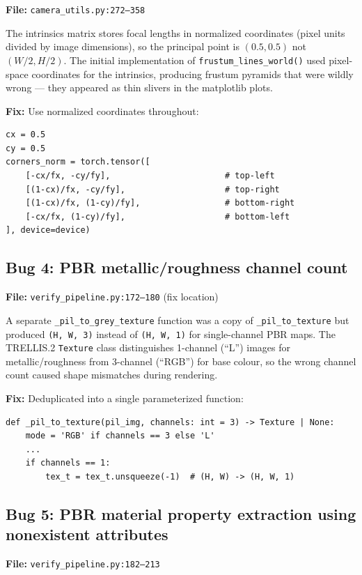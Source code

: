 \textbf{File:} \texttt{camera\_utils.py:272--358}

The intrinsics matrix stores focal lengths in normalized coordinates
(pixel units divided by image dimensions), so the principal point is
$(0.5, 0.5)$ not $(W/2, H/2)$. The initial implementation of
\texttt{frustum\_lines\_world()} used pixel-space coordinates for the
intrinsics, producing frustum pyramids that were wildly wrong --- they
appeared as thin slivers in the matplotlib plots.

\textbf{Fix:} Use normalized coordinates throughout:
\begin{lstlisting}
cx = 0.5
cy = 0.5
corners_norm = torch.tensor([
    [-cx/fx, -cy/fy],                       # top-left
    [(1-cx)/fx, -cy/fy],                    # top-right
    [(1-cx)/fx, (1-cy)/fy],                 # bottom-right
    [-cx/fx, (1-cy)/fy],                    # bottom-left
], device=device)
\end{lstlisting}

\subsection{Bug 4: PBR metallic/roughness channel count}

\textbf{File:} \texttt{verify\_pipeline.py:172--180} (fix location)

A separate \texttt{\_pil\_to\_grey\_texture} function was a copy of
\texttt{\_pil\_to\_texture} but produced \texttt{(H, W, 3)} instead of
\texttt{(H, W, 1)} for single-channel PBR maps. The TRELLIS.2
\texttt{Texture} class distinguishes 1-channel (``L'') images for
metallic/roughness from 3-channel (``RGB'') for base colour, so the wrong
channel count caused shape mismatches during rendering.

\textbf{Fix:} Deduplicated into a single parameterized function:
\begin{lstlisting}
def _pil_to_texture(pil_img, channels: int = 3) -> Texture | None:
    mode = 'RGB' if channels == 3 else 'L'
    ...
    if channels == 1:
        tex_t = tex_t.unsqueeze(-1)  # (H, W) -> (H, W, 1)
\end{lstlisting}

\subsection{Bug 5: PBR material property extraction using nonexistent attributes}

\textbf{File:} \texttt{verify\_pipeline.py:182--213}

